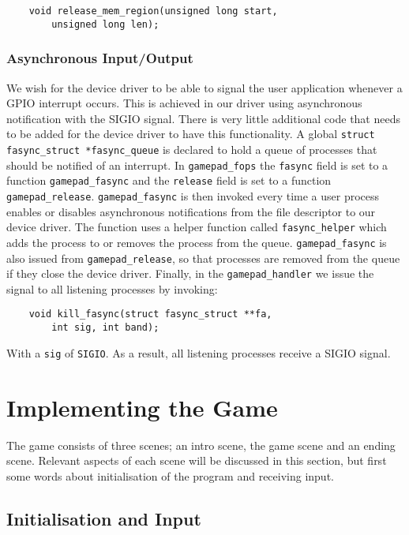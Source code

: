 \begin{lstlisting}
	void release_mem_region(unsigned long start,
		unsigned long len);
\end{lstlisting}

\subsubsection{Asynchronous Input/Output}

We wish for the device driver to be able to signal the user application whenever
a GPIO interrupt occurs. This is achieved in our driver using asynchronous
notification with the SIGIO signal. There is very little additional code that
needs to be added for the device driver to have this functionality. A global
\texttt{struct fasync\_struct *fasync\_queue} is declared to hold a queue of
processes that should be notified of an interrupt. In \texttt{gamepad\_fops} the
\texttt{fasync} field is set to a function \texttt{gamepad\_fasync} and the
\texttt{release} field is set to a function \texttt{gamepad\_release}.
\texttt{gamepad\_fasync} is then invoked every time a user process enables or
disables asynchronous notifications from the file descriptor to our device
driver. The function uses a helper function called \texttt{fasync\_helper} which
adds the process to or removes the process from the queue.
\texttt{gamepad\_fasync} is also issued from \texttt{gamepad\_release}, so that
processes are removed from the queue if they close the device driver. Finally,
in the \texttt{gamepad\_handler} we issue the signal to all listening processes
by invoking:

\begin{lstlisting}
	void kill_fasync(struct fasync_struct **fa,
		int sig, int band);
\end{lstlisting}

With a \texttt{sig} of \texttt{SIGIO}. As a result, all listening processes
receive a SIGIO signal.

\section{Implementing the Game}

The game consists of three scenes; an intro scene, the game scene and an ending
scene. Relevant aspects of each scene will be discussed in this section, but
first some words about initialisation of the program and receiving input.

\subsection{Initialisation and Input}

